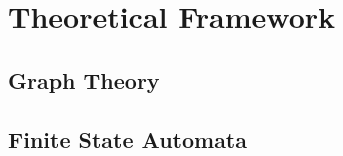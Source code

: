 
\chapter{Theoretical Framework} %
\label{ch:theo_frame}

\ifpdf
    \graphicspath{{2_preliminaries/figures/PNG/}{2_preliminaries/figures/PDF/}{2_preliminaries/figures/}}
\else
    \graphicspath{{2_preliminaries/figures/EPS/}{2_preliminaries/figures/}}
\fi






\section{Graph Theory}


\section{Finite State Automata}

